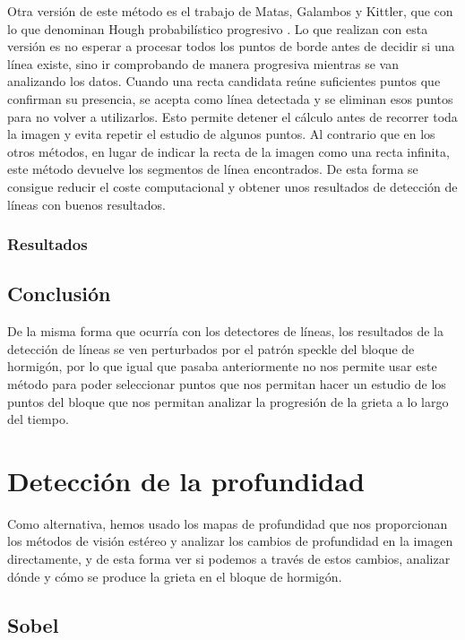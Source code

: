 Otra versión de este método es el trabajo de Matas, Galambos y Kittler, que con lo que denominan Hough probabilístico progresivo \cite{matas2000ppht}. Lo que realizan con esta versión es no esperar a procesar todos los puntos de borde antes de decidir si una línea existe, sino ir comprobando de manera progresiva mientras se van analizando los datos. Cuando una recta candidata reúne suficientes puntos que confirman su presencia, se acepta como línea detectada y se eliminan esos puntos para no volver a utilizarlos. Esto permite detener el cálculo antes de recorrer toda la imagen y evita repetir el estudio de algunos puntos. Al contrario que en los otros métodos, en lugar de indicar la recta de la imagen como una recta infinita, este método devuelve los segmentos de línea encontrados. De esta forma se consigue reducir el coste computacional y obtener unos resultados de detección de líneas con buenos resultados.

\subsubsection{Resultados}


\subsection{Conclusión}
De la misma forma que ocurría con los detectores de líneas, los resultados de la detección de líneas se ven perturbados por el patrón speckle del bloque de hormigón, por lo que igual que pasaba anteriormente no nos permite usar este método para poder seleccionar puntos que nos permitan hacer un estudio de los puntos del bloque que nos permitan analizar la progresión de la grieta a lo largo del tiempo.

\section{Detección de la profundidad}
Como alternativa, hemos usado los mapas de profundidad que nos proporcionan los métodos de visión estéreo y analizar los cambios de profundidad en la imagen directamente, y de esta forma ver si podemos a través de estos cambios, analizar dónde y cómo se produce la grieta en el bloque de hormigón.

\subsection{Sobel}

